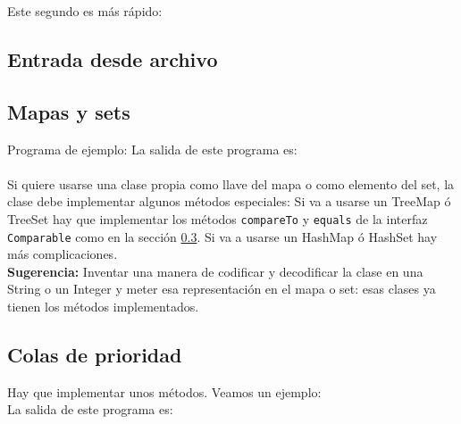 \documentclass[10pt,letterpaper]{article}
\begin{document}
\bigskip

Este segundo es más rápido: \\
\subsection{Entrada desde archivo}

\subsection{Mapas y sets}
Programa de ejemplo:
\bigskip
La salida de este programa es: \\

\ttfamily 
{}
\\ \normalfont\normalsize
\bigskip 
Si quiere usarse una clase propia como llave del mapa o como elemento del set, la clase debe implementar
algunos métodos especiales: Si va a usarse un TreeMap ó TreeSet hay que implementar los métodos \texttt{compareTo} y 
\texttt{equals} de la interfaz \texttt{Comparable} como en la sección \ref{colas_de_prioridad_java}. Si va a usarse
un HashMap ó HashSet hay más complicaciones.\\
\smallskip
\textbf{Sugerencia:} Inventar una manera de codificar y decodificar la clase en una String o un Integer y meter esa representación en el mapa o set: esas clases ya tienen los métodos implementados.

\subsection{Colas de prioridad}
\label{colas_de_prioridad_java}
Hay que implementar unos métodos. Veamos un ejemplo: \\
\bigskip
La salida de este programa es: \\
\end{document}
